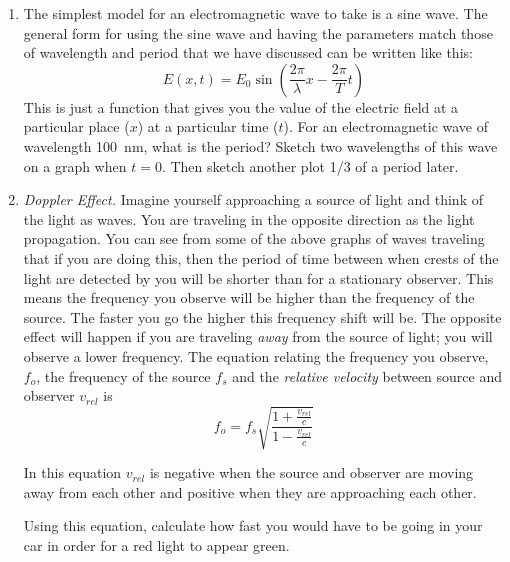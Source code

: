 \begin{enumerate}
\item
The simplest model for an electromagnetic wave to take is a sine wave. The general form for using the sine wave and having the parameters match those of wavelength and period that we have discussed can be written like this:
\[E(x, t) = E_0 \sin\left(\frac{2 \pi}{\lambda}x - \frac{2\pi}{T}t\right)\] 
This is just a function that gives you the value of the electric field at a particular place ($x$) at a particular time ($t$). For an electromagnetic wave of wavelength \SI{100}{\nano\meter}, what is the period? Sketch two wavelengths of this wave on a graph when $t=0$. Then sketch another plot 1/3 of a period later.


\item
\emph{Doppler Effect.} Imagine yourself approaching a source of light and think of the light as waves. You are traveling in the opposite direction as the light propagation. You can see from some of the above graphs of waves traveling that if you are doing this, then the period of time between when crests of the light are detected by you will be shorter than for a stationary observer. This means the frequency you observe will be higher than the frequency of the source. The faster you go the higher this frequency shift will be. The opposite effect will happen if you are traveling \emph{away} from the source of light; you will observe a lower frequency. The equation relating the frequency you observe, $f_o$, the frequency of the source $f_s$ and the \emph{relative velocity} between source and observer $v_{rel}$ is 
\[f_o = f_s\sqrt{\frac{1+\frac{v_{rel}}{c}}{1-\frac{v_{rel}}{c}}}\]

In this equation $v_{rel}$ is negative when the source and observer are moving away from each other and positive when they are approaching each other.

Using this equation, calculate how fast you would have to be going in your car in order for a red light to appear green.\giantskip


\end{enumerate}
